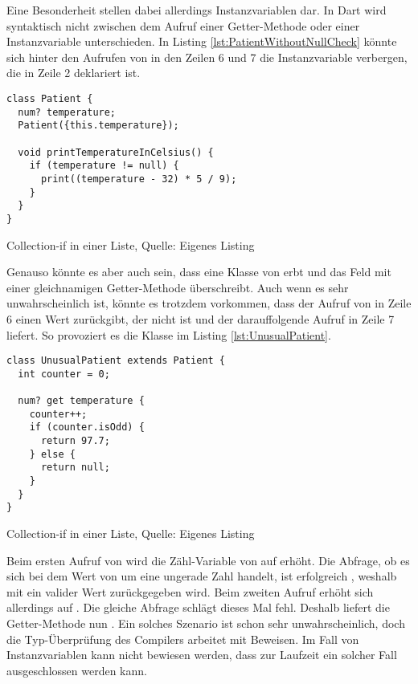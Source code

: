 Eine Besonderheit stellen dabei allerdings Instanzvariablen dar.
In Dart wird syntaktisch nicht zwischen dem Aufruf einer Getter-Methode oder einer Instanzvariable unterschieden.
In Listing \ref{lst:PatientWithoutNullCheck}
könnte sich hinter den Aufrufen von  in den Zeilen 6 und 7 die Instanzvariable verbergen, die in Zeile 2 deklariert ist.

\ifincludeall
  \begin{listing}[ht]
    \begin{verbatim}
class Patient {
  num? temperature;
  Patient({this.temperature});

  void printTemperatureInCelsius() {
    if (temperature != null) {
      print((temperature - 32) * 5 / 9);
    }
  }
}
    \end{verbatim}
    \caption[Collection-if in einer Liste]{Collection-if in einer Liste, Quelle: Eigenes Listing}
    \label{lst:PatientWithoutNullCheck}
  \end{listing}
\fi

Genauso könnte es aber auch sein, dass eine Klasse von  erbt und das Feld  mit einer gleichnamigen Getter-Methode überschreibt.
Auch wenn es sehr unwahrscheinlich ist, könnte es trotzdem vorkommen, dass der Aufruf von  in Zeile 6 einen Wert zurückgibt, der nicht  ist und der darauffolgende Aufruf in Zeile 7  liefert.
So provoziert es die Klasse  im Listing \ref{lst:UnusualPatient}.
\ifincludeall
  \begin{listing}[ht]
    \begin{verbatim}
class UnusualPatient extends Patient {
  int counter = 0;

  num? get temperature {
    counter++;
    if (counter.isOdd) {
      return 97.7;
    } else {
      return null;
    }
  }
}
\end{verbatim}
    \caption[Collection-if in einer Liste]{Collection-if in einer Liste, Quelle: Eigenes Listing}
    \label{lst:UnusualPatient}
  \end{listing}
\fi


Beim ersten Aufruf von  wird die Zähl-Variable  von  auf  erhöht.
Die Abfrage, ob es sich bei dem Wert von  um eine ungerade Zahl handelt, ist erfolgreich , weshalb mit  ein valider Wert zurückgegeben wird.
Beim zweiten Aufruf erhöht sich  allerdings auf .
Die gleiche Abfrage schlägt dieses Mal fehl.
Deshalb liefert die Getter-Methode nun  .
Ein solches Szenario ist schon sehr unwahrscheinlich, doch die Typ-Überprüfung des Compilers arbeitet mit Beweisen.
Im Fall von Instanzvariablen kann nicht bewiesen werden, dass zur Laufzeit ein solcher Fall ausgeschlossen werden kann.




